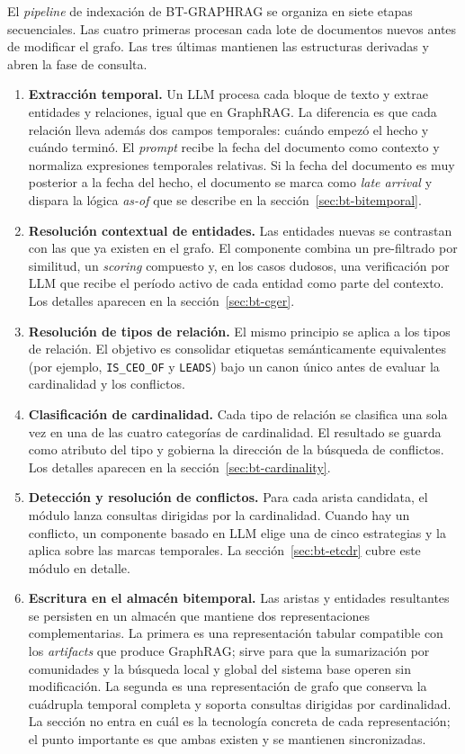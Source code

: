 El \emph{pipeline} de indexación de BT-GRAPHRAG se organiza en siete etapas secuenciales. Las cuatro primeras procesan cada lote de documentos nuevos antes de modificar el grafo. Las tres últimas mantienen las estructuras derivadas y abren la fase de consulta.

\begin{enumerate}
    \item \textbf{Extracción temporal.} Un LLM procesa cada bloque de texto y extrae entidades y relaciones, igual que en GraphRAG. La diferencia es que cada relación lleva además dos campos temporales: cuándo empezó el hecho y cuándo terminó. El \emph{prompt} recibe la fecha del documento como contexto y normaliza expresiones temporales relativas. Si la fecha del documento es muy posterior a la fecha del hecho, el documento se marca como \emph{late arrival} y dispara la lógica \emph{as-of} que se describe en la sección~\ref{sec:bt-bitemporal}.
    \item \textbf{Resolución contextual de entidades.} Las entidades nuevas se contrastan con las que ya existen en el grafo. El componente combina un pre-filtrado por similitud, un \emph{scoring} compuesto y, en los casos dudosos, una verificación por LLM que recibe el período activo de cada entidad como parte del contexto. Los detalles aparecen en la sección~\ref{sec:bt-cger}.
    \item \textbf{Resolución de tipos de relación.} El mismo principio se aplica a los tipos de relación. El objetivo es consolidar etiquetas semánticamente equivalentes (por ejemplo, \texttt{IS\_CEO\_OF} y \texttt{LEADS}) bajo un canon único antes de evaluar la cardinalidad y los conflictos.
    \item \textbf{Clasificación de cardinalidad.} Cada tipo de relación se clasifica una sola vez en una de las cuatro categorías de cardinalidad. El resultado se guarda como atributo del tipo y gobierna la dirección de la búsqueda de conflictos. Los detalles aparecen en la sección~\ref{sec:bt-cardinality}.
    \item \textbf{Detección y resolución de conflictos.} Para cada arista candidata, el módulo lanza consultas dirigidas por la cardinalidad. Cuando hay un conflicto, un componente basado en LLM elige una de cinco estrategias y la aplica sobre las marcas temporales. La sección~\ref{sec:bt-etcdr} cubre este módulo en detalle.
    \item \textbf{Escritura en el almacén bitemporal.} Las aristas y entidades resultantes se persisten en un almacén que mantiene dos representaciones complementarias. La primera es una representación tabular compatible con los \emph{artifacts} que produce GraphRAG; sirve para que la sumarización por comunidades y la búsqueda local y global del sistema base operen sin modificación. La segunda es una representación de grafo que conserva la cuádrupla temporal completa y soporta consultas dirigidas por cardinalidad. La sección no entra en cuál es la tecnología concreta de cada representación; el punto importante es que ambas existen y se mantienen sincronizadas.

\end{enumerate}
